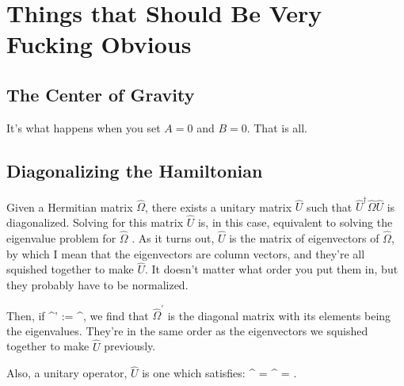 \chapter[Fucking Duh]{Things that Should Be Very Fucking \mbox{Obvious}}
\label{fuckingduh}


\section{The Center of Gravity}
It's what happens when you set $A = 0$ and $B = 0$.   That is all.

\section{Diagonalizing the Hamiltonian}
Given a Hermitian matrix $\hat{\Omega}$, there exists a unitary matrix $\hat{U}$ such that $\hat{U}^{\dagger}\hat{\Omega}\hat{U}$ is diagonalized.  Solving for this matrix $\hat{U}$ is, in this case, equivalent to solving the eigenvalue problem for $\hat{\Omega}$ \cite{shankar}.  As it turns out, $\hat{U}$ is the matrix of eigenvectors of $\hat{\Omega}$, by which I mean that the eigenvectors are column vectors, and they're all squished together to make $\hat{U}$.  It doesn't matter what order you put them in, but they probably have to be normalized.

Then, if 
\beq
\hat{\Omega}^{'} := ^{\dagger}\hat{\Omega},
\eeq	
we find that $\hat{\Omega}^{'}$ is the diagonal matrix with its elements being the eigenvalues.  They're in the same order as the eigenvectors we squished together to make $\hat{U}$ previously.

Also, a unitary operator, $\hat{U}$ is one which satisfies:
\bea
{}^{\dagger} = ^{\dagger}  = .
\eea

